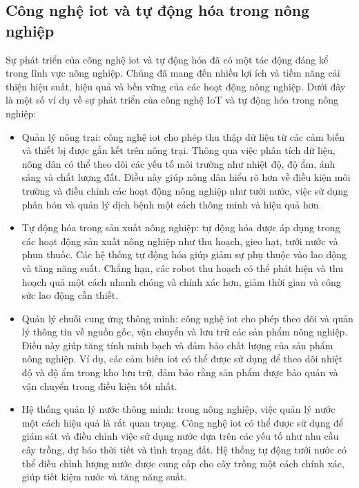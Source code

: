 \subsection{Công nghệ \acrshort{iot} và tự động hóa trong nông nghiệp}

Sự phát triển của công nghệ \acrfull{iot} và tự động hóa đã có một tác động đáng kể trong lĩnh vực nông nghiệp. Chúng đã mang đến nhiều lợi ích và tiềm năng cải thiện hiệu suất, hiệu quả và bền vững của các hoạt động nông nghiệp. Dưới đây là một số ví dụ về sự phát triển của công nghệ IoT và tự động hóa trong nông nghiệp:


\begin{itemize}
    \item Quản lý nông trại: công nghệ \acrshort{iot} cho phép thu thập dữ liệu từ các cảm biến và thiết bị được gắn kết trên nông trại. Thông qua việc phân tích dữ liệu, nông dân có thể theo dõi các yếu tố môi trường như nhiệt độ, độ ẩm, ánh sáng và chất lượng đất. Điều này giúp nông dân hiểu rõ hơn về điều kiện môi trường và điều chỉnh các hoạt động nông nghiệp như tưới nước, việc sử dụng phân bón và quản lý dịch bệnh một cách thông minh và hiệu quả hơn.
    \item Tự động hóa trong sản xuất nông nghiệp: tự động hóa được áp dụng trong các hoạt động sản xuất nông nghiệp như thu hoạch, gieo hạt, tưới nước và phun thuốc. Các hệ thống tự động hóa giúp giảm sự phụ thuộc vào lao động và tăng năng suất. Chẳng hạn, các robot thu hoạch có thể phát hiện và thu hoạch quả một cách nhanh chóng và chính xác hơn, giảm thời gian và công sức lao động cần thiết.
    \item Quản lý chuỗi cung ứng thông minh: công nghệ \acrshort{iot} cho phép theo dõi và quản lý thông tin về nguồn gốc, vận chuyển và lưu trữ các sản phẩm nông nghiệp. Điều này giúp tăng tính minh bạch và đảm bảo chất lượng của sản phẩm nông nghiệp. Ví dụ, các cảm biến \acrshort{iot} có thể được sử dụng để theo dõi nhiệt độ và độ ẩm trong kho lưu trữ, đảm bảo rằng sản phẩm được bảo quản và vận chuyển trong điều kiện tốt nhất.
    \item Hệ thống quản lý nước thông minh: trong nông nghiệp, việc quản lý nước một cách hiệu quả là rất quan trọng. Công nghệ \acrshort{iot} có thể được sử dụng để giám sát và điều chỉnh việc sử dụng nước dựa trên các yếu tố như nhu cầu cây trồng, dự báo thời tiết và tình trạng đất. Hệ thống tự động tưới nước có thể điều chỉnh lượng nước được cung cấp cho cây trồng một cách chính xác, giúp tiết kiệm nước và tăng năng suất.
\end{itemize}

